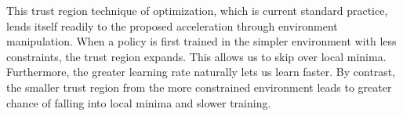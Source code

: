 \documentclass{article}
\begin{document}
This trust region technique of optimization, which is current standard practice, lends itself readily to the proposed acceleration through environment manipulation. When a policy is first trained in the simpler environment with less constraints, the trust region expands. This allows us to skip over local minima. Furthermore, the greater learning rate naturally lets us learn faster. By contrast, the smaller trust region from the more constrained environment leads to greater chance of falling into local minima and slower training.
\end{document}
